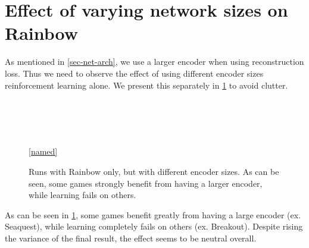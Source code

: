 


\section{Effect of varying network sizes on Rainbow}
\label{sec-effectiveness-of-cont-updating}
As mentioned in \ref{sec-net-arch}, we use a larger encoder when using
reconstruction loss. Thus we need to observe the effect of using
different encoder sizes reinforcement learning alone.
We present this separately in \ref{fig:big-vs-small-enc-rl-only} to avoid clutter.

\begin{figure}[!t]
  \captionsetup[subfloat]{position=top,labelformat=empty}
  \vspace{-1.5cm}
  \centering

    \subfloat[]{  \resizebox{0.4\textwidth}{!}{}}
    \subfloat[]{  \resizebox{0.4\textwidth}{!}{}}\\
  \vspace{-1cm}
    \subfloat[]{  \resizebox{0.4\textwidth}{!}{}}
    \subfloat[]{  \resizebox{0.4\textwidth}{!}{}}\\
  \vspace{-1cm}
    \subfloat[]{  \resizebox{0.4\textwidth}{!}{}}
    \subfloat[]{  \resizebox{0.4\textwidth}{!}{}}\\
  \vspace{-1cm}
    \subfloat[]{  \resizebox{0.4\textwidth}{!}{}}
    \\

    \ref{named}
  \caption{Runs with Rainbow only, but with different encoder sizes. As can be seen,
  some games strongly benefit from having a larger encoder, while learning
fails on others.}
  \label{fig:big-vs-small-enc-rl-only}
\end{figure}

As can be seen in \ref{fig:big-vs-small-enc-rl-only}, some games benefit greatly from
having a large encoder (ex. Seaquest), while learning completely fails on others 
(ex. Breakout).
Despite rising the variance of the final result, the effect seems to be neutral
overall.



